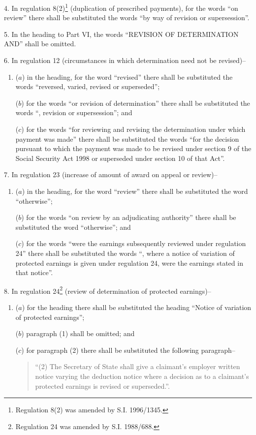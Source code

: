 \documentclass[12pt,a4paper]{article}
\begin{document}
\medskip

4.  In regulation 8(2)\footnote{\frenchspacing Regulation 8(2) was amended by S.I. 1996/1345.} (duplication of prescribed payments), for the words “on review” there shall be substituted the words “by way of revision or supersession”.

\medskip

5.  In the heading to Part VI, the words “REVISION OF DETERMINATION AND” shall be omitted.

\medskip

6.  In regulation 12 (circumstances in which determination need not be revised)–
\begin{enumerate}\item[]
($a$) in the heading, for the word “revised” there shall be substituted the words “reversed, varied, revised or superseded”;

($b$) for the words “or revision of determination” there shall be substituted the words “, revision or supersession”; and

($c$) for the words “for reviewing and revising the determination under which payment was made” there shall be substituted the words “for the decision pursuant to which the payment was made to be revised under section 9 of the Social Security Act 1998 or superseded under section 10 of that Act”.
\end{enumerate}

\medskip

7.  In regulation 23 (increase of amount of award on appeal or review)–
\begin{enumerate}\item[]
($a$) in the heading, for the word “review” there shall be substituted the word “otherwise”;

($b$) for the words “on review by an adjudicating authority” there shall be substituted the word “otherwise”; and

($c$) for the words “were the earnings subsequently reviewed under regulation 24” there shall be substituted the words “, where a notice of variation of protected earnings is given under regulation 24, were the earnings stated in that notice”.
\end{enumerate}

\medskip

8.  In regulation 24\footnote{\frenchspacing Regulation 24 was amended by S.I. 1988/688.} (review of determination of protected earnings)–
\begin{enumerate}\item[]
($a$) for the heading there shall be substituted the heading “Notice of variation of protected earnings”;

($b$) paragraph (1) shall be omitted; and

($c$) for paragraph (2) there shall be substituted the following paragraph–
\begin{quotation}
“(2) The Secretary of State shall give a claimant’s employer written notice varying the deduction notice where a decision as to a claimant’s protected earnings is revised or superseded.”.
\end{quotation}
\end{enumerate}
\end{document}

